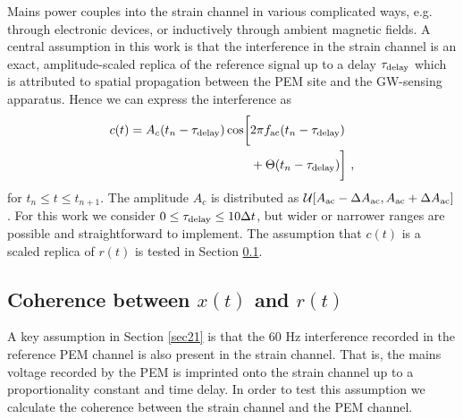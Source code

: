 \documentclass[pra,superscriptaddress,reprint,amsmath,amssymb,nofootinbib]{revtex4-2}
\begin{document}
Mains power couples into the strain channel in various complicated ways, e.g. through electronic devices, or inductively through ambient magnetic fields. A central assumption in this work is that the interference in the strain channel is an exact, amplitude-scaled replica of the reference signal up to a delay $\tau_{\rm delay}$ which is attributed to spatial propagation between the PEM site and the GW-sensing apparatus. Hence we can express the interference as 
 \begin{align}
	c(t) = A_c(t_n - \tau_{\rm delay}) \cos \biggl [ & 2 \pi f_{\rm ac} (t_n - \tau_{\rm delay}) \nonumber \\ 
	&+ \Theta(t_n - \tau_{\rm delay}	) \biggr ] \ ,
	\label{eq:vclutter}
\end{align}
for $t_n \leq t \leq t_{n+1}$. The amplitude $A_c$ is distributed as $\mathcal{U}[A_{\rm ac}- \Delta A_{\rm ac} ,A_{\rm ac} + \Delta A_{\rm ac} ]$. For this work we consider $0 \leq \tau_{\rm delay} \leq 10 \Delta t$, but wider or narrower ranges are possible and straightforward to implement. The assumption that $c(t)$ is a scaled replica of $r(t)$ is tested in Section \ref{sec23}.




\subsection{Coherence between $x(t)$ and $r(t)$}  \label{sec23}
A key assumption in Section \ref{sec21} is that the 60 Hz interference recorded in the reference PEM channel is also present in the strain channel. That is, the mains voltage recorded by the PEM is imprinted onto the strain channel up to a proportionality constant and time delay. In order to test this assumption we calculate the coherence between the strain channel and the PEM channel. \newline 
\end{document}
